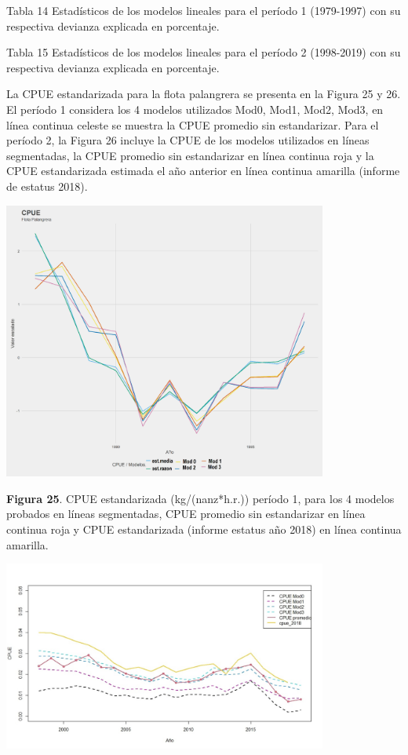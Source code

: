 \documentclass[
  spanish,
]{article}
\begin{document}
Tabla 14 Estadísticos de los modelos lineales para el período 1
(1979-1997) con su respectiva devianza explicada en porcentaje.

Tabla 15 Estadísticos de los modelos lineales para el período 2
(1998-2019) con su respectiva devianza explicada en porcentaje.

La CPUE estandarizada para la flota palangrera se presenta en la Figura
25 y 26. El período 1 considera los 4 modelos utilizados Mod0, Mod1,
Mod2, Mod3, en línea continua celeste se muestra la CPUE promedio sin
estandarizar. Para el período 2, la Figura 26 incluye la CPUE de los
modelos utilizados en líneas segmentadas, la CPUE promedio sin
estandarizar en línea continua roja y la CPUE estandarizada estimada el
año anterior en línea continua amarilla (informe de estatus 2018).

\begin{center}
\includegraphics[width=0.8\textwidth]{Figuras/Figura_25.png}
\end{center}

\small \textbf{Figura 25}. CPUE estandarizada (kg/(nanz*h.r.)) período
1, para los 4 modelos probados en líneas segmentadas, CPUE promedio sin
estandarizar en línea continua roja y CPUE estandarizada (informe
estatus año 2018) en línea continua amarilla. \vspace{0.5cm} \normalsize

\begin{center}
\includegraphics[width=0.8\textwidth]{Figuras/Figura_26.png}
\end{center}
\end{document}
